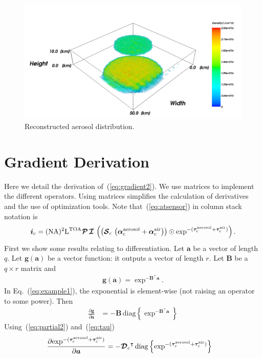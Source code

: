 \documentclass[10pt,twocolumn,letterpaper]{article}
\newcommand{\OpSphere}{\bm{\mathcal{S}}}
\newcommand{\OpDistance}{\bm{\mathcal{D}}}
\newcommand{\OpInt}{\bm{\mathcal{I}}}
\newcommand{\OpCamera}{\bm{\mathcal{P}}}
\newcommand{\OpDiag}[1]{\mathrm{diag}\left\{#1\right\}}
\newcommand{\roundy}[1]{\left(#1\right)}
\newcommand{\PartDeriv}[2]{\frac{\partial{#1}}{\partial{#2}}}
\newcommand{\vect}[1]{\bm{#1}}
\newcommand{\mat}[1]{\bm{#1}}
\newcommand{\transpose}[1]{{#1}^\intercal}
\begin{document}
\begin{figure}
  \centering
    \includegraphics[width=\columnwidth]{images/reconstructed}
  \caption{Reconstructed aerosol distribution.}
  \label{fig:synth-result}
\end{figure}

\appendix

\section{Gradient Derivation}
\label{sec:gradient-derivation}

Here we detail the derivation of~(\ref{eq:gradient2}).  We use
matrices to implement the different operators. Using matrices
simplifies the calculation of derivatives and the use of optimization
tools. Note that~(\ref{eq:atsensor}) in column stack notation is
\begin{align}
  \vect{i}_c=(\rm{NA})^2\mathrm{L}^{\rm TOA} \OpCamera \, \OpInt \,
  \roundy{ \roundy {\OpSphere_c \, \roundy{\vect{\alpha}^{\rm
          aerosol}_c + \vect{\alpha}^{\rm air}_c} } \odot
    \exp^{-(\vect{\tau}^{\rm aerosol}_c + \vect{\tau}^{\rm air}_c)}}.
  \label{eq:atsensor-matrix}
\end{align}
First we show some results relating to differentiation. Let $\vect{a}$
be a vector of length $q$. Let $\vect{g}(\vect{a})$ be a vector
function: it outputs a vector of length $r$. Let $\mat{B}$ be a $q
\times r$ matrix and
\begin{align}
  \vect{g}(\vect{a}) = \exp^{-\transpose{\mat{B}}\vect{a}}.
  \label{eq:example1}
\end{align}
In Eq.~(\ref{eq:example1}), the exponential is element-wise (not
raising an operator to some power). Then
\begin{align}
  \label{eq:partial2}
  \PartDeriv{\vect{g}}{\vect{a}} &= - \mat{B} \,
  \OpDiag{\exp^{-\transpose{\mat{B}}\vect{a}}}
\end{align}
Using~(\ref{eq:partial2}) and~(\ref{eq:tau})
\begin{align}
  \label{eq:partial4}
  \PartDeriv{\exp^{-(\vect{\tau}^{\rm aerosol}_c + \vect{\tau}^{\rm
        air}_c)}}{\vect{a}} &= - \transpose{\OpDistance_c} \,
  \OpDiag{\exp^{-(\vect{\tau}^{\rm aerosol}_c + \vect{\tau}^{\rm
        air}_c)}}
\end{align}
\end{document}
